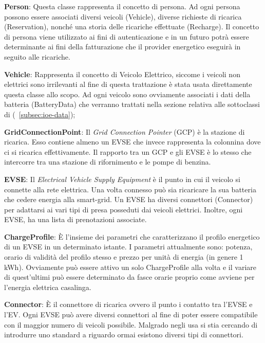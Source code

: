 \begin{description}
	\item \textbf{Person}: Questa classe rappresenta il concetto di persona. Ad ogni persona possono essere associati diversi veicoli (Vehicle), diverse richieste di ricarica (Reservation), nonché una storia delle ricariche effettuate (Recharge). Il concetto di persona viene utilizzato ai fini di autenticazione e in un futuro potrà essere determinante ai fini della fatturazione che il provider energetico eseguirà in seguito alle ricariche.
	\item \textbf{Vehicle}: Rappresenta il concetto di Veicolo Elettrico, siccome i veicoli non elettrici sono irrilevanti al fine di questa trattazione è stata usata direttamente questa classe allo scopo. Ad ogni veicolo sono ovviamente associati i dati della batteria (BatteryData) che verranno trattati nella sezione relativa alle sottoclassi di  (~\ref{subsec:ioe-data});
	\item \textbf{GridConnectionPoint}: Il \emph{Grid Connection Pointer} (GCP) è la stazione di ricarica. Esso contiene almeno un EVSE che invece rappresenta la colonnina dove ci si ricarica effettivamente. Il rapporto tra un GCP e gli EVSE è lo stesso che intercorre tra una stazione di rifornimento e le pompe di benzina. 
	\item \textbf{EVSE}: Il \emph{Electrical Vehicle Supply Equipment} è il punto in cui il veicolo si connette alla rete elettrica. Una volta connesso può sia ricaricare la sua batteria che cedere energia alla smart-grid. Un EVSE ha diversi connettori (Connector) per adattarsi ai vari tipi di presa posseduti dai veicoli elettrici. Inoltre, ogni EVSE, ha una lista di prenotazioni associate.
	\item \textbf{ChargeProfile}: È l'insieme dei parametri che caratterizzano il profilo energetico di un EVSE in un determinato istante. I parametri attualmente sono: potenza, orario di validità del profilo stesso e prezzo per unità di energia (in genere 1 kWh). Ovviamente può essere attivo un solo ChargeProfile alla volta e il variare di quest'ultimi può essere determinato da fasce orarie proprio come avviene per l'energia elettrica casalinga.
	\item \textbf{Connector}: È il connettore di ricarica ovvero il punto i contatto tra l'EVSE e l'EV. Ogni EVSE può avere diversi connettori al fine di poter essere compatibile con il maggior numero di veicoli possibile. Malgrado negli usa si stia cercando di introdurre uno standard a riguardo ormai esistono diversi tipi di connettori. 

\end{description}
